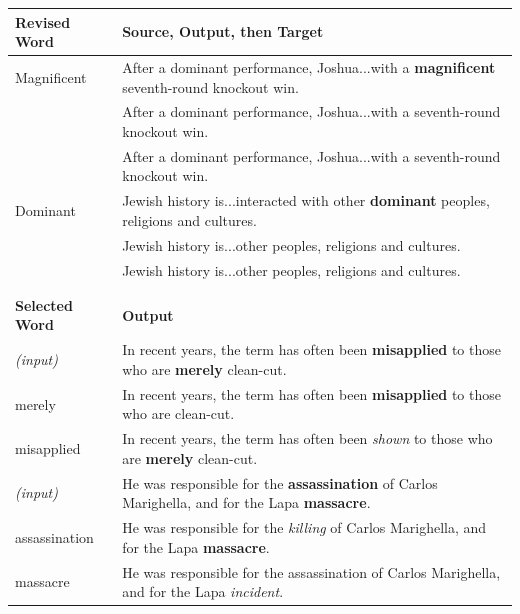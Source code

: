 \begin{table}[htb]
\begin{tabular}{ll}
\multicolumn{1}{l|}{\textbf{Revised Word}} & \textbf{Source, Output, then Target} \\ \hline \hline
\multicolumn{1}{l|}{Magnificent}  & After a dominant performance, Joshua...with a \textbf{magnificent} seventh-round knockout win. \\ 
\multicolumn{1}{l|}{}           & After a dominant performance, Joshua...with a seventh-round knockout win. \\
\multicolumn{1}{l|}{}           & After  a  dominant  performance, Joshua...with a seventh-round knockout win. \\ \hline \hline
\multicolumn{1}{l|}{Dominant} & Jewish history is...interacted with other \textbf{dominant} peoples, religions and cultures.                 \\
\multicolumn{1}{l|}{}           & Jewish history is...other peoples, religions and cultures.   \\
\multicolumn{1}{l|}{}           & Jewish history is...other peoples, religions and cultures.  \\ \\ \\ 

 \multicolumn{1}{l|}{\textbf{Selected Word}} & \textbf{Output}  \\ \hline \hline
\multicolumn{1}{l|}{ \emph{(input)}} & In recent years, the term has often been \textbf{misapplied} to those who are \textbf{merely} clean-cut.        \\
\multicolumn{1}{l|}{merely} & In recent years, the term has often been \textbf{misapplied} to those who are clean-cut.     \\
 \multicolumn{1}{l|}{misapplied}  & In recent years, the term has often been \emph{shown} to those who are \textbf{merely} clean-cut.  \\ \hline \hline
 \multicolumn{1}{l|}{\emph{(input)}} & He was responsible for the \textbf{assassination} of Carlos Marighella, and for the Lapa \textbf{massacre}. \\
 \multicolumn{1}{l|}{assassination} & He was responsible for the \emph{killing} of Carlos Marighella, and for the Lapa \textbf{massacre}. \\
 \multicolumn{1}{l|}{massacre} & He was responsible for the assassination of Carlos Marighella, and for the Lapa \emph{incident}. \\ \hline \hline


\end{tabular}
\end{table}
